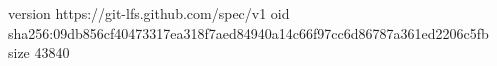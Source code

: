 version https://git-lfs.github.com/spec/v1
oid sha256:09db856cf40473317ea318f7aed84940a14c66f97cc6d86787a361ed2206c5fb
size 43840
